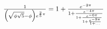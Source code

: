 $\frac{1}{\Bigl(\sqrt{\phi\sqrt{5}}-\phi\Bigr)  e^{\frac25\pi}} =    1+\frac{e^{-2\pi}}      {1+\frac{e^{-4\pi}}        {1+\frac{e^{-6\pi}}          {1+\frac{e^{-8\pi}}            {1+\ldots} } } }$